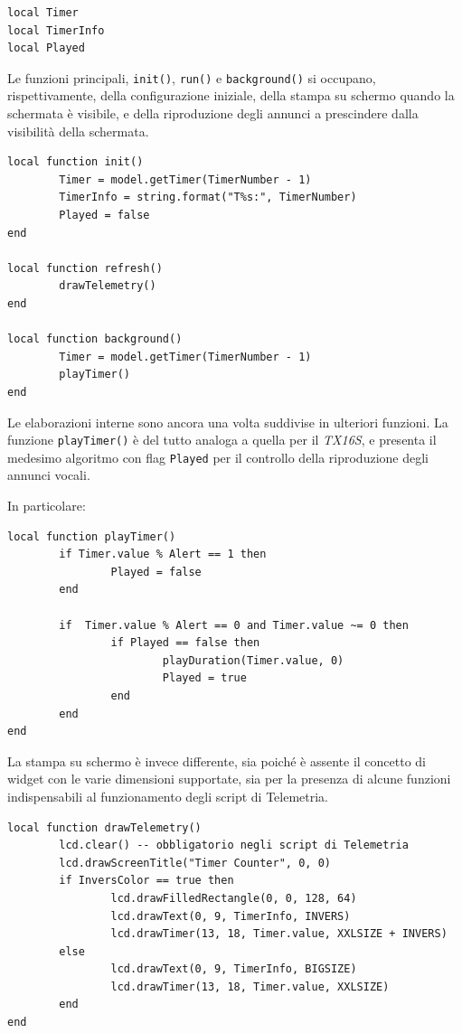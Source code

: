 \documentclass[a4paper, 12pt]{report} %
\begin{document}
\begin{lstlisting}
local Timer
local TimerInfo
local Played 
\end{lstlisting}

Le funzioni principali, \texttt{init()}, \texttt{run()} e \texttt{background()} si occupano, rispettivamente, della configurazione iniziale, della stampa su schermo quando la schermata è visibile, e della riproduzione degli annunci a prescindere dalla visibilità della schermata.

\begin{lstlisting}
local function init()
        Timer = model.getTimer(TimerNumber - 1)
        TimerInfo = string.format("T%s:", TimerNumber)
        Played = false
end

local function refresh()
        drawTelemetry()
end

local function background()
        Timer = model.getTimer(TimerNumber - 1)
        playTimer()
end
\end{lstlisting}

Le elaborazioni interne sono ancora una volta suddivise in ulteriori funzioni. La funzione \texttt{playTimer()} è del tutto analoga a quella per il \emph{TX16S}, e presenta il medesimo algoritmo con flag \texttt{Played} per il controllo della riproduzione degli annunci vocali.

In particolare:

\begin{lstlisting}
local function playTimer()
        if Timer.value % Alert == 1 then
                Played = false
        end

        if  Timer.value % Alert == 0 and Timer.value ~= 0 then
                if Played == false then
                        playDuration(Timer.value, 0)
                        Played = true
                end
        end
end 
\end{lstlisting}

La stampa su schermo è invece differente, sia poiché è assente il concetto di widget con le varie dimensioni supportate, sia per la presenza di alcune funzioni indispensabili al funzionamento degli script di Telemetria. 

\begin{lstlisting}
local function drawTelemetry()
        lcd.clear() -- obbligatorio negli script di Telemetria
        lcd.drawScreenTitle("Timer Counter", 0, 0)
        if InversColor == true then
                lcd.drawFilledRectangle(0, 0, 128, 64)
                lcd.drawText(0, 9, TimerInfo, INVERS)
                lcd.drawTimer(13, 18, Timer.value, XXLSIZE + INVERS)
        else
                lcd.drawText(0, 9, TimerInfo, BIGSIZE)
                lcd.drawTimer(13, 18, Timer.value, XXLSIZE)
        end
end
\end{lstlisting}
\end{document}
